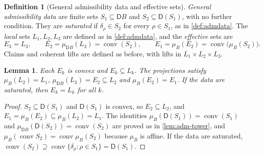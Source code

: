 \documentclass[11pt]{article}
\newtheorem{lemma}[theorem]{Lemma}
\theoremstyle{definition}
\newtheorem{definition}[theorem]{Definition}
\theoremstyle{remark}
\newcommand{\D}{\mathsf{D}}
\begin{document}
\begin{definition}[General admissibility data and effective sets]\label{def:effective}
\emph{General admissibility data} are finite sets $S_1\subseteq\D B$ and $S_2\subseteq\D(S_1)$, with no
further condition. They are \emph{saturated} if $\delta_\rho\in S_2$ for every $\rho\in S_1$, as in
\cref{def:admdata}. The \emph{local} sets $L_1,L_2,L_3$ are defined as in \cref{def:admdata}, and the
\emph{effective} sets are
\[
E_3=L_3,\qquad E_2=\mu_{\D B}(L_3)=\operatorname{conv}(S_2),\qquad
E_1=\mu_B(E_2)=\operatorname{conv}\big(\mu_B(S_2)\big).
\]
Claims and coherent lifts are defined as before, with lifts in $L_1\times L_2\times L_3$.
\end{definition}

\begin{lemma}\label{lem:effective}
Each $E_k$ is convex and $E_k\subseteq L_k$. The projections satisfy $\mu_B(L_2)=L_1$,
$\mu_{\D B}(L_3)=E_2\subseteq L_2$ and $\mu_B(E_2)=E_1$. If the data are saturated, then $E_k=L_k$
for all $k$.
\end{lemma}
\begin{proof}
$S_2\subseteq\D(S_1)$ and $\D(S_1)$ is convex, so $E_2\subseteq L_2$, and $E_1=\mu_B(E_2)\subseteq
\mu_B(L_2)=L_1$. The identities $\mu_B(\D(S_1))=\operatorname{conv}(S_1)$ and
$\mu_{\D B}(\D(S_2))=\operatorname{conv}(S_2)$ are proved as in \cref{lem:adm-tower}, and
$\mu_B(\operatorname{conv}S_2)=\operatorname{conv}\mu_B(S_2)$ because $\mu_B$ is affine. If the data are
saturated, $\operatorname{conv}(S_2)\supseteq\operatorname{conv}\{\delta_\rho:\rho\in S_1\}=\D(S_1)$.
\end{proof}
\end{document}

